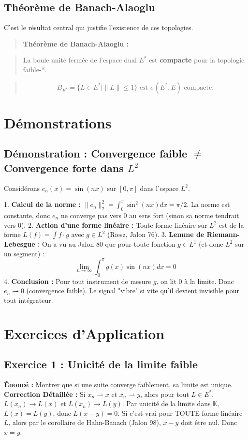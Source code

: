 \documentclass[11pt,a4paper]{article}
\begin{document}
\subsection*{Théorème de Banach-Alaoglu}

C'est le résultat central qui justifie l'existence de ces topologies.

\begin{quote}\textbf{Théorème de Banach-Alaoglu :}\end{quote}
\begin{quote}La boule unité fermée de l'espace dual $E^*$ est \textbf{compacte} pour la topologie faible-*.\end{quote}
\begin{quote}$$B_{E^*} = \{ L \in E^* \mid \|L\| \le 1 \} \text{ est } \sigma(E^*, E)\text{-compacte.}$$\end{quote}

\section{Démonstrations}

\subsection*{Démonstration : Convergence faible $\neq$ Convergence forte dans $L^2$}

Considérons $e_n(x) = \sin(nx)$ sur $[0, \pi]$ dans l'espace $L^2$.

1. \textbf{Calcul de la norme :} $\|e_n\|_2^2 = \int_0^\pi \sin^2(nx) dx = \pi/2$. La norme est constante, donc $e_n$ ne converge pas vers 0 au sens fort (sinon sa norme tendrait vers 0).
2. \textbf{Action d'une forme linéaire :} Toute forme linéaire sur $L^2$ est de la forme $L(f) = \int f \cdot g$ avec $g \in L^2$ (Riesz, Jalon 76).
3. \textbf{Lemme de Riemann-Lebesgue :} On a vu au Jalon 80 que pour toute fonction $g \in L^1$ (et donc $L^2$ sur un segment) :
   $$\lim_{n \to \infty} \int_0^\pi g(x) \sin(nx) dx = 0$$
4. \textbf{Conclusion :} Pour tout instrument de mesure $g$, on lit 0 à la limite. Donc $e_n \rightharpoonup 0$ (convergence faible).
   Le signal "vibre" si vite qu'il devient invisible pour tout intégrateur.

\section{Exercices d'Application}

\subsection*{Exercice 1 : Unicité de la limite faible}
\textbf{Énoncé :} Montrer que si une suite converge faiblement, sa limite est unique.
\textbf{Correction Détaillée :}
Si $x_n \rightharpoonup x$ et $x_n \rightharpoonup y$, alors pour tout $L \in E^*$, $L(x_n) \to L(x)$ et $L(x_n) \to L(y)$. Par unicité de la limite dans $\mathbb{K}$, $L(x) = L(y)$, donc $L(x-y) = 0$.
Si c'est vrai pour TOUTE forme linéaire $L$, alors par le corollaire de Hahn-Banach (Jalon 98), $x-y$ doit être nul. Donc $x=y$.
\end{document}
